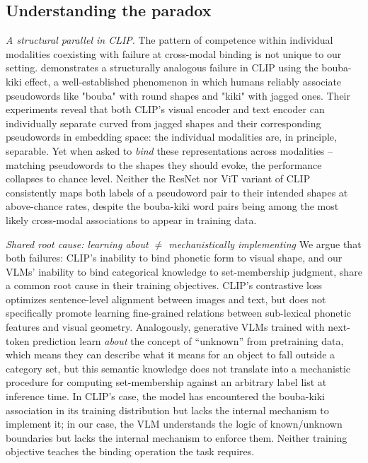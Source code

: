 \documentclass[10pt]{article} %
\begin{document}
\subsection{Understanding the paradox} \label{apx: paradox}
{\em A structural parallel in CLIP}. The pattern of competence within individual modalities coexisting with failure at cross-modal binding is not unique to our setting. \cite{kouwenhoven2025cross} demonstrates a structurally analogous failure in CLIP using the bouba-kiki effect, a well-established phenomenon in which humans reliably associate pseudowords like "bouba" with round shapes and "kiki" with jagged ones. Their experiments reveal that both CLIP's visual encoder and text encoder can individually separate curved from jagged shapes and their corresponding pseudowords in embedding space: the individual modalities are, in principle, separable. Yet when asked to \textit{bind} these representations across modalities -- matching pseudowords to the shapes they should evoke, the performance collapses to chance level. Neither the ResNet nor ViT variant of CLIP consistently maps both labels of a pseudoword pair to their intended shapes at above-chance rates, despite the bouba-kiki word pairs being among the most likely cross-modal associations to appear in training data.

{\em Shared root cause: learning about $\neq$ mechanistically implementing}
 We argue that both failures: CLIP's inability to bind phonetic form to visual shape, and our VLMs' inability to bind categorical knowledge to set-membership judgment, share a common root cause in their training objectives. CLIP's contrastive loss optimizes sentence-level alignment between images and text, but does not specifically promote learning fine-grained relations between sub-lexical phonetic features and visual geometry. Analogously, generative VLMs trained with next-token prediction learn \textit{about} the concept of ``unknown'' from pretraining data, which means they can describe what it means for an object to fall outside a category set, but this semantic knowledge does not translate into a mechanistic procedure for computing set-membership against an arbitrary label list at inference time. In CLIP's case, the model has encountered the bouba-kiki association in its training distribution but lacks the internal mechanism to implement it; in our case, the VLM understands the logic of known/unknown boundaries but lacks the internal mechanism to enforce them. Neither training objective teaches the binding operation the task requires.
\end{document}

